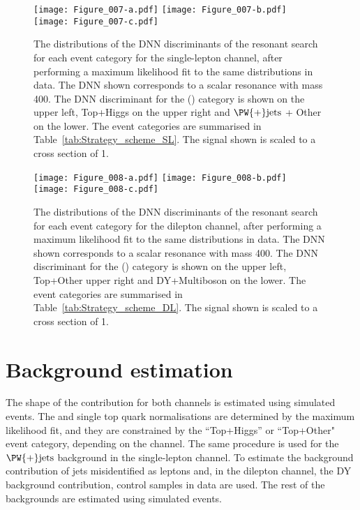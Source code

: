 \begin{figure}[htb!]
  \centering
  \texttt{[image: Figure\_007-a.pdf]}
  \texttt{[image: Figure\_007-b.pdf]}\\
  \texttt{[image: Figure\_007-c.pdf]}
  \caption{The distributions of the DNN discriminants of the resonant search for each event category for the single-lepton channel, after performing a maximum likelihood fit to the same distributions in data. The DNN shown corresponds to a scalar resonance with mass 400\GeV. The DNN discriminant for the \HH(\GGF) category is shown on the upper left, Top+Higgs on the upper right and $\PW{+}\text{jets}$ + Other on the lower. The event categories are summarised in Table~\ref{tab:Strategy_scheme_SL}. The signal shown is scaled to a cross section of 1\pb.}
  \label{fig:DNNoutput_resonant_SL}
\end{figure}

\begin{figure}[htb!p]
  \centering
  \texttt{[image: Figure\_008-a.pdf]}
  \texttt{[image: Figure\_008-b.pdf]}\\
  \texttt{[image: Figure\_008-c.pdf]}
  \caption{The distributions of the DNN discriminants of the resonant search for each event category for the dilepton channel, after performing a maximum likelihood fit to the same distributions in data. The DNN shown corresponds to a scalar resonance with mass 400\GeV. The DNN discriminant for the \HH(\GGF) category is shown on the upper left, Top+Other upper right and DY+Multiboson on the lower. The event categories are summarised in Table~\ref{tab:Strategy_scheme_DL}. The signal shown is scaled to a cross section of 1\pb.}
  \label{fig:DNNoutput_resonant_DL}
\end{figure}
\section{Background estimation}\label{Background_estimation}

The shape of the \ttbar contribution for both channels is estimated using simulated events.
The \ttbar and single top quark normalisations are determined by the maximum likelihood fit, and they are constrained by the ``Top+Higgs'' or ``Top+Other" event category, depending on the channel.
The same procedure is used for the $\PW{+}\text{jets}$ background in the single-lepton channel.
To estimate the background contribution of jets misidentified as leptons and, in the dilepton channel, the DY background contribution, control samples in data are used.
The rest of the backgrounds are estimated using simulated events.



